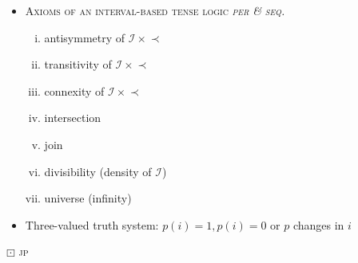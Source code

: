 \documentclass[11pt]{article}
\begin{document}
\begin{framed}
	\begin{itemize}
		\item 	\textsc{Axioms of an interval-based tense logic \textit{per} \citet{Hamblin1971} \textit{\& seq.}}
		\begin{enumerate}[i.]
			\item antisymmetry of $\mathcal I\times\!\prec$
			\item transitivity of $\mathcal I\times\!\prec$
			\item connexity of $\mathcal I\times\!\prec$
			\item intersection
			\item join
			\item divisibility (density of $\mathcal I$)
			\item universe (infinity)
			
		\end{enumerate}
		
		\item Three-valued truth system: $p(i)=1,p(i)=0$ or $p$ changes in $i$
	\end{itemize}
\end{framed}
\vfill


\vfill\hspace*{\fill}\scriptsize$\boxdot$ \textsc{jp}
\end{document}
